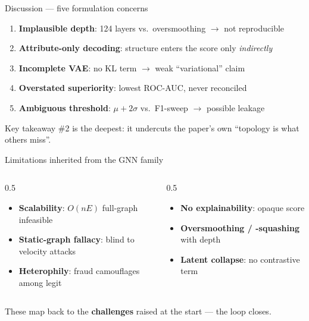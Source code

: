 \documentclass[10pt,aspectratio=169]{beamer}
\newcommand{\hl}[1]{\textcolor{mBlue}{\textbf{#1}}}    %
\newcommand{\rd}[1]{\textcolor{mRed}{\textbf{#1}}}     %
\newenvironment{takeaway}{\begin{exampleblock}{Key takeaway}}{\end{exampleblock}}
\begin{document}
\begin{frame}{Discussion --- five formulation concerns}
  \begin{enumerate}\small
    \item \rd{Implausible depth}: 124 layers vs.\ oversmoothing $\rightarrow$ not reproducible
    \item \rd{Attribute-only decoding}: structure enters the score only \emph{indirectly}
    \item \rd{Incomplete VAE}: no KL term $\rightarrow$ weak ``variational'' claim
    \item \rd{Overstated superiority}: lowest ROC-AUC, never reconciled
    \item \rd{Ambiguous threshold}: $\mu+2\sigma$ vs.\ F1-sweep $\rightarrow$ possible leakage
  \end{enumerate}
  \begin{takeaway}
    \#2 is the deepest: it undercuts the paper's own ``topology is what others miss''.
  \end{takeaway}
\end{frame}

\begin{frame}{Limitations inherited from the GNN family}
  \begin{columns}[T]
    \begin{column}{0.5\textwidth}
      \begin{itemize}\small
        \item \rd{Scalability}: $O(nE)$ full-graph infeasible
        \item \rd{Static-graph fallacy}: blind to velocity attacks
        \item \rd{Heterophily}: fraud camouflages among legit
      \end{itemize}
    \end{column}
    \begin{column}{0.5\textwidth}
      \begin{itemize}\small
        \item \rd{No explainability}: opaque score
        \item \rd{Oversmoothing / -squashing} with depth
        \item \rd{Latent collapse}: no contrastive term
      \end{itemize}
    \end{column}
  \end{columns}
  \vspace{0.3em}
  {\footnotesize These map back to the \hl{challenges} raised at the start --- the loop closes.}
\end{frame}
\end{document}
